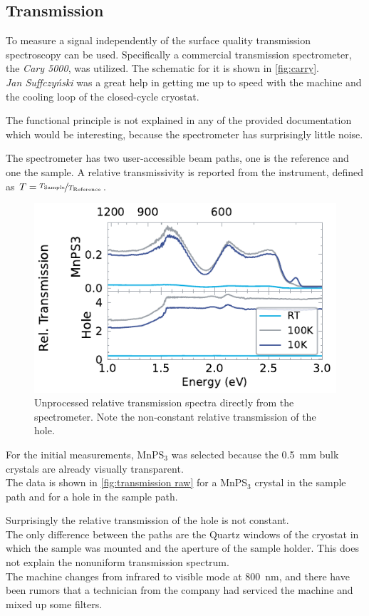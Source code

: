 \documentclass[
	oneside,
	parskip=half,
	a4paper,
]{scrbook}
\begin{document}
\subsection{Transmission}
To measure a signal independently of the surface quality transmission spectroscopy can be used.
Specifically a commercial transmission spectrometer, the \textit{Cary 5000}, was utilized.
The schematic for it is shown in \autoref{fig:carry}.\\
\textit{Jan Suffczyński} was a great help in getting me up to speed with the machine and the cooling loop of the closed-cycle cryostat.

The functional principle is not explained in any of the provided documentation which would be interesting, because the spectrometer has surprisingly little noise.

The spectrometer has two user-accessible beam paths, one is the reference and one the sample.
A relative transmissivity is reported from the instrument, defined as $T = \nicefrac{T_\text{Sample}}{T_\text{Reference}}$.

\begin{figure}[b]
	\centering
	\includegraphics{../figures/2024-03-15 MnPS3 transmission raw.pdf}
	\caption{Unprocessed relative transmission spectra directly from the spectrometer. Note the non-constant relative transmission of the hole.}
	\label{fig:transmission raw}
\end{figure}
For the initial measurements, MnPS$_3$ was selected because the \SI{.5}{mm} bulk crystals are already visually transparent.\\
The data is shown in \autoref{fig:transmission raw} for a MnPS$_3$ crystal in the sample path and for a hole in the sample path.

Surprisingly the relative transmission of the hole is not constant.\\
The only difference between the paths are the Quartz windows of the cryostat in which the sample was mounted and the aperture of the sample holder.
This does not explain the nonuniform transmission spectrum.\\
The machine changes from infrared to visible mode at \SI{800}{nm}, and there have been rumors that a technician from the company had serviced the machine and mixed up some filters.
\end{document}
